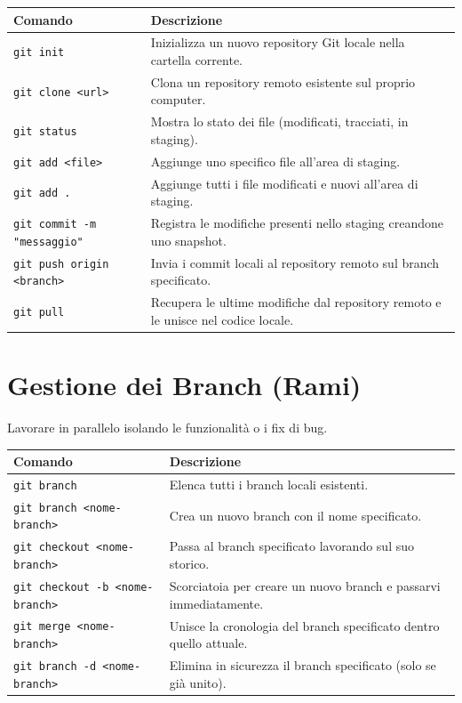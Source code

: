 \documentclass[11pt, a4paper]{article}
\begin{document}
\begin{center}
\small
\begin{tabular}{lp{9cm}}
\toprule
\textbf{Comando} & \textbf{Descrizione} \\
\midrule
\texttt{git init} & Inizializza un nuovo repository Git locale nella cartella corrente. \\
\texttt{git clone <url>} & Clona un repository remoto esistente sul proprio computer. \\
\texttt{git status} & Mostra lo stato dei file (modificati, tracciati, in staging). \\
\texttt{git add <file>} & Aggiunge uno specifico file all'area di staging. \\
\texttt{git add .} & Aggiunge tutti i file modificati e nuovi all'area di staging. \\
\texttt{git commit -m "messaggio"} & Registra le modifiche presenti nello staging creandone uno snapshot. \\
\texttt{git push origin <branch>} & Invia i commit locali al repository remoto sul branch specificato. \\
\texttt{git pull} & Recupera le ultime modifiche dal repository remoto e le unisce nel codice locale. \\
\bottomrule
\end{tabular}
\end{center}

\section{Gestione dei Branch (Rami)}
Lavorare in parallelo isolando le funzionalità o i fix di bug.

\begin{center}
\small
\begin{tabular}{lp{9cm}}
\toprule
\textbf{Comando} & \textbf{Descrizione} \\
\midrule
\texttt{git branch} & Elenca tutti i branch locali esistenti. \\
\texttt{git branch <nome-branch>} & Crea un nuovo branch con il nome specificato. \\
\texttt{git checkout <nome-branch>} & Passa al branch specificato lavorando sul suo storico. \\
\texttt{git checkout -b <nome-branch>} & Scorciatoia per creare un nuovo branch e passarvi immediatamente. \\
\texttt{git merge <nome-branch>} & Unisce la cronologia del branch specificato dentro quello attuale. \\
\texttt{git branch -d <nome-branch>} & Elimina in sicurezza il branch specificato (solo se già unito). \\
\bottomrule
\end{tabular}
\end{center}
\end{document}
